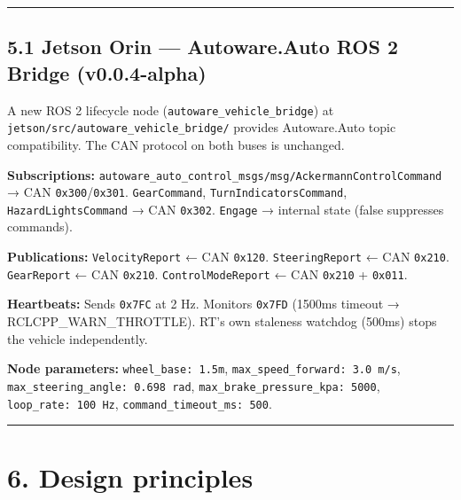 \documentclass[12pt,a4paper,oneside]{report}
\begin{document}
\begin{center}\rule{0.5\linewidth}{0.5pt}\end{center}

\subsection{5.1 Jetson Orin --- Autoware.Auto ROS 2 Bridge
(v0.0.4-alpha)}\label{jetson-orin-autoware.auto-ros-2-bridge-v0.0.4-alpha}

A new ROS 2 lifecycle node (\texttt{autoware\_vehicle\_bridge}) at
\texttt{jetson/src/autoware\_vehicle\_bridge/} provides Autoware.Auto topic
compatibility. The CAN protocol on both buses is unchanged.

\textbf{Subscriptions:}
\texttt{autoware\_auto\_control\_msgs/msg/AckermannControlCommand} → CAN
\texttt{0x300}/\texttt{0x301}. \texttt{GearCommand},
\texttt{TurnIndicatorsCommand}, \texttt{HazardLightsCommand} → CAN
\texttt{0x302}. \texttt{Engage} → internal state (false suppresses commands).

\textbf{Publications:} \texttt{VelocityReport} ← CAN \texttt{0x120}.
\texttt{SteeringReport} ← CAN \texttt{0x210}. \texttt{GearReport} ← CAN
\texttt{0x210}. \texttt{ControlModeReport} ← CAN \texttt{0x210} +
\texttt{0x011}.

\textbf{Heartbeats:} Sends \texttt{0x7FC} at 2 Hz. Monitors \texttt{0x7FD}
(1500ms timeout → RCLCPP\_WARN\_THROTTLE). RT's own staleness watchdog (500ms)
stops the vehicle independently.

\textbf{Node parameters:} \texttt{wheel\_base:\ 1.5m},
\texttt{max\_speed\_forward:\ 3.0\ m/s},
\texttt{max\_steering\_angle:\ 0.698\ rad},
\texttt{max\_brake\_pressure\_kpa:\ 5000}, \texttt{loop\_rate:\ 100\ Hz},
\texttt{command\_timeout\_ms:\ 500}.

\begin{center}\rule{0.5\linewidth}{0.5pt}\end{center}

\section{6. Design principles}\label{design-principles}
\end{document}
